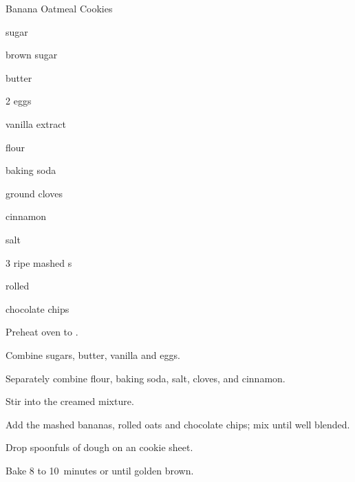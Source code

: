 \begin{recipe}{Banana Oatmeal Cookies}{}{}

\begin{ingredients}
\item \C{\half} sugar
\item \C{\half} brown sugar
\item {} butter
\item 2 eggs
\item {} vanilla extract
\item {} flour
\item {} baking soda
\item \tp{\half} ground cloves
\item {} cinnamon
\item \tp{\eighth} salt
\item 3 ripe mashed s
\item {} rolled 
\item {} chocolate chips
\end{ingredients}

\begin{directions}
\item Preheat oven to .
\item Combine sugars, butter, vanilla and eggs.
\item Separately combine flour, baking soda, salt, cloves, and cinnamon.
\item Stir into the creamed mixture.
\item Add the mashed bananas, rolled oats and chocolate chips; mix until well blended.
\item Drop spoonfuls of dough on an cookie sheet.
\item Bake 8 to 10~minutes or until golden brown.
\end{directions}
\end{recipe}
